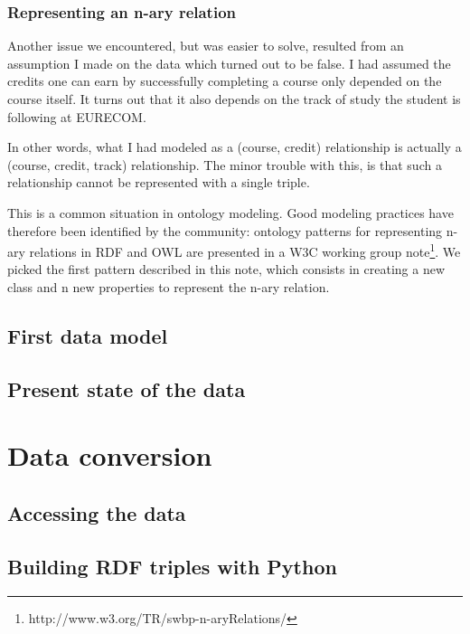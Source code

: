 \documentclass[a4paper,11pt]{report}
\begin{document}
\subsection{Representing an n-ary relation}
Another issue we encountered, but was easier to solve, resulted from an assumption I made on the data which turned out to be false. I had assumed the credits one can earn by successfully completing a course only depended on the course itself. It turns out that it also depends on the track of study the student is following at EURECOM. 

In other words, what I had modeled as a (course, credit) relationship is actually a (course, credit, track) relationship. The minor trouble with this, is that such a relationship cannot be represented with a single triple. 

This is a common situation in ontology modeling. Good modeling practices have therefore been identified by the community: ontology patterns for representing n-ary relations in RDF and OWL are presented in a W3C working group note\footnote{http://www.w3.org/TR/swbp-n-aryRelations/}. We picked the first pattern described in this note, which consists in creating a new class and n new properties to represent the n-ary relation. 

\section{First data model}
\section{Present state of the data}



\chapter{Data conversion}
\section{Accessing the data} 
\section{Building RDF triples with Python}
\end{document}
